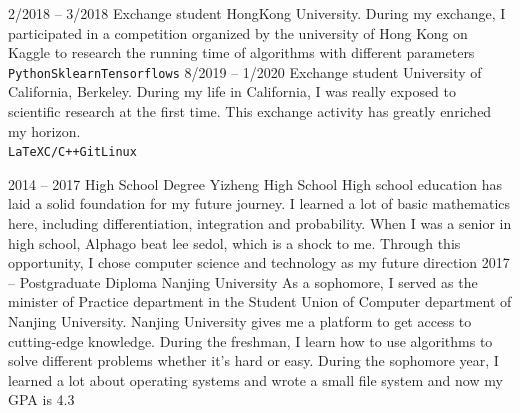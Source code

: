 \documentclass[9pt]{developercv} %
\begin{document}
\begin{center}
\end{center}



\begin{entrylist}
    \entry
    {2/2018 -- 3/2018}
    {Exchange student}
    {HongKong University.}
    {During my exchange, I participated in a competition organized by the university of Hong Kong on Kaggle to research the running time of algorithms with different parameters\\ \texttt{Python}\slashsep\texttt{Sklearn}\slashsep\texttt{Tensorflows}}
    \entry
    {8/2019 -- 1/2020}
    {Exchange student}
    {University of California, Berkeley.}
    {During my life in California, I was really exposed to scientific research at the first time. This exchange activity has greatly enriched my horizon.\\ \texttt{LaTeX}\slashsep\texttt{C/C++}\slashsep\texttt{Git}\slashsep\texttt{Linux}}
\end{entrylist}



\begin{entrylist}
    \entry
    {2014 -- 2017}
    {High School Degree}
    {Yizheng High School}
    {High school education has laid a solid foundation for my future journey. I learned a lot of basic mathematics here, including differentiation, integration and probability. When I was a senior in high school, Alphago beat lee sedol, which is a shock to me. Through this opportunity, I chose computer science and technology as my future direction\lorem}
    \entry
    {2017 -- }
    {Postgraduate Diploma}
    {Nanjing University}
    {As a sophomore, I served as the minister of Practice department in the Student Union of Computer department of Nanjing University. Nanjing University gives me a platform to get access to cutting-edge knowledge. During the freshman, I learn how to use algorithms to solve different problems whether it's hard or easy. During the sophomore year, I learned a lot about operating systems and wrote a small file system and now my GPA is 4.3}
\end{entrylist}
\end{document}
